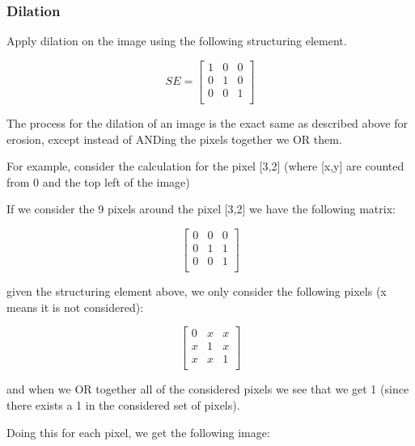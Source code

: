 \documentclass[12pt, letterpaper]{article}
\begin{document}
\subsubsection{Dilation}

Apply dilation on the image using the following structuring element.

\[ SE = \begin{bmatrix}1&0&0\\0&1&0\\0&0&1\\ \end{bmatrix} \]

The process for the dilation of an image is the exact same as described above for erosion, except instead of ANDing the pixels together we OR them.

For example, consider the calculation for the pixel [3,2] (where [x,y] are counted from 0 and the top left of the image)

If we consider the 9 pixels around the pixel [3,2] we have the following matrix:

\[\begin{bmatrix}0&0&0\\0&1&1\\0&0&1\\ \end{bmatrix} \]

given the structuring element above, we only consider the following pixels (x means it is not considered):

\[\begin{bmatrix}0&x&x\\x&1&x\\x&x&1\\ \end{bmatrix} \]

and when we OR together all of the considered pixels we see that we get 1 (since there exists a 1 in the considered set of pixels).

Doing this for each pixel, we get the following image:
\end{document}
